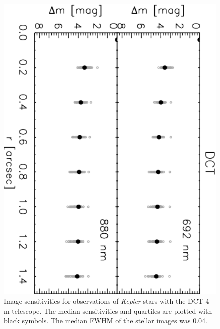 \documentclass[twocolumn,appendixfloats]{aastex6}
\begin{document}
\begin{figure}[!]
\centering
\includegraphics[angle=90, scale=0.47]{DCT_speckle_images_sensitivities.pdf}
\caption{Image sensitivities for observations of {\it Kepler} stars with the DCT 4-m 
telescope. The median sensitivities and quartiles are plotted with black symbols.
The median FWHM of the stellar images was 0.04\arcsec.
\label{Sensitivites_DCT}}
\end{figure}
\end{document}
